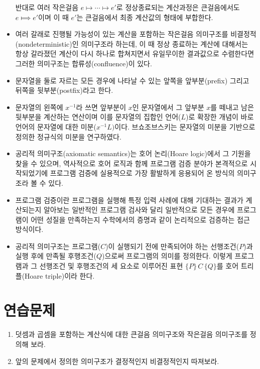 \begin{itemize}
       반대로 여러 작은걸음 $e\longmapsto \cdots \longmapsto e'$로
       정상종료되는 계산과정은 큰걸음에서도 $e\Longmapsto e'$이며 이 때
       $e'$는 큰걸음에서 최종 계산값의 형태에 부합한다.
 \item 여러 갈래로 진행될 가능성이 있는 계산을 포함하는 작은걸음 의미구조를
       비결정적(nondeterministic)인 의미구조라 하는데, 이 때 정상 종료하는
       계산에 대해서는 항상 갈라졌던 계산이 다시 하나로 합쳐지면서 유일무이한
       결과값으로 수렴한다면 그러한 의미구조는 합류성(confluence)이 있다.
 \item 문자열을 둘로 자르는 모든 경우에 나타날 수 있는 앞쪽을 앞부분(prefix)
       그리고 뒤쪽을 뒷부분(postfix)라고 한다.
 \item 문자열의 왼쪽에 $x^{-1}$라 쓰면 앞부분이 $x$인 문자열에서 그 앞부분 $x$를
       떼내고 남은 뒷부분을 계산하는 연산이며 이를 문자열의 집합인 언어($L$)로
       확장한 개념이 바로 언어의 문자열에 대한 미분($x^{-1} L)$이다.
       브쇼조브스키는 문자열의 미분을 기반으로 정의한 정규식의 미분을 연구하였다.
 \item 공리적 의미구조(axiomatic semantics)는 호어 논리(Hoare logic)에서
       그 기원을 찾을 수 있으며, 역사적으로 호어 로직과 함께 프로그램
       검증 분야가 본격적으로 시작되었기에 프로그램 검증에 실용적으로
       가장 활발하게 응용되어 온 방식의 의미구조라 볼 수 있다.
 \item 프로그램 검증이란 프로그램을 실행해 특정 입력 사례에 대해 기대하는
       결과가 계산되는지 알아보는 일반적인 프로그램 검사와 달리 일반적으로
       모든 경우에 프로그램이 어떤 성질을 만족하는지 수학에서의 증명과 같이
       논리적으로 검증하는 접근 방식이다.
 \item 공리적 의미구조는 프로그램($C$)이 실행되기 전에 만족되어야 하는
       선행조건($P$)과 실행 후에 만족될 후행조건($Q$)으로써 프로그램의
       의미를 정의한다. 이렇게 프로그램과 그 선행조건 및 후행조건의
       세 요소로 이루어진 표현 $\{P\}\,C\,\{Q\}$를
       호어 트리플(Hoare triple)이라 한다.
\end{itemize}

\section*{연습문제}
\begin{enumerate}
 \item 덧셈과 곱셈을 포함하는 계산식에 대한
       큰걸음 의미구조와 작은걸음 의미구조를 정의해 보라.
 \item 앞의 문제에서 정의한 의미구조가 결정적인지 비결정적인지 따져보라.
\end{enumerate}

